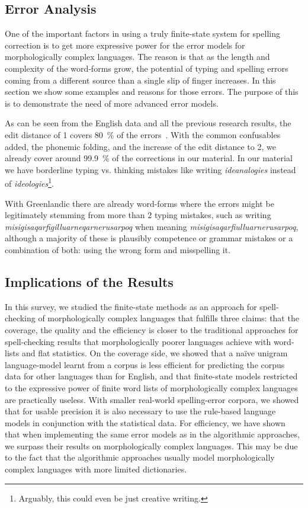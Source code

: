 \documentclass[a4paper,12pt]{article}
\begin{document}
\subsection{Error Analysis}
\label{subsec:error-analysis}

One of the important factors in using a truly finite-state system for
spelling correction is to get more expressive power for the error models for
morphologically complex languages. The reason is that as the length and
complexity of the word-forms grow, the potential of typing and spelling errors
coming from a different source than a single slip of finger increases. In this
section we show some examples and reasons for those errors. The purpose of
this is to demonstrate the need of more advanced error models.

As can be seen from the English data and all the previous research results, the
edit distance of 1 covers 80~\% of the errors~\cite[]{damerau/1964}. With the
common confusables added, the phonemic folding, and the increase of the edit
distance to 2, we already cover around 99.9~\% of the corrections in our
material. In our material we have borderline typing vs. thinking
mistakes like writing \emph{ideanalogies} instead of
\emph{ideologies}\footnote{Arguably, this could even be just creative writing.}.

With Greenlandic there are already word-forms where the errors might be
legitimately stemming from more than 2 typing mistakes, such as writing
\emph{misigisaqarfigilluarneqarnerusarpoq} when meaning
\emph{misigisaqarfiulluarnerusarpoq}, although a majority of these is plausibly
competence or grammar mistakes or a combination of both: using the wrong form
and misspelling it.


\subsection{Implications of the Results}

In this survey, we studied the finite-state methods as an approach for
spell-checking of morphologically complex languages that fulfills three claims:
that the coverage, the quality and the efficiency is closer to the traditional
approaches for spell-checking results that morphologically poorer languages
achieve with word-lists and flat statistics. On the coverage side, we showed
that a naïve unigram language-model learnt from a corpus is less efficient for
predicting the corpus data for other languages than for English, and that
finite-state models restricted to the expressive power of finite word lists of
morphologically complex languages are practically useless. With smaller
real-world spelling-error corpora, we showed that for usable precision it is
also necessary to use the rule-based language models in conjunction with the
statistical data.  For efficiency, we have shown that when implementing the
same error models as in the algorithmic approaches, we surpass their results on
morphologically complex languages.  This may be due to the fact that the
algorithmic approaches usually model morphologically complex languages with
more limited dictionaries.
\end{document}
